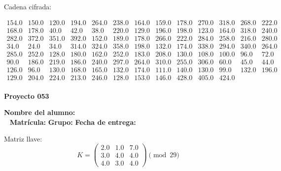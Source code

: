\documentclass[12pt]{article}
\begin{document}
Cadena cifrada:
\begin{center}
$\begin{array}{lllllllllllll}
154.0 & 150.0 & 120.0 & 194.0 & 264.0 & 238.0 & 164.0 & 159.0 & 178.0 & 270.0 & 318.0 & 268.0 & 222.0\\
168.0 & 178.0 & 40.0 & 42.0 & 38.0 & 220.0 & 129.0 & 196.0 & 198.0 & 123.0 & 164.0 & 318.0 & 240.0\\
282.0 & 372.0 & 351.0 & 392.0 & 152.0 & 189.0 & 178.0 & 266.0 & 222.0 & 284.0 & 258.0 & 216.0 & 280.0\\
34.0 & 24.0 & 34.0 & 314.0 & 324.0 & 358.0 & 198.0 & 132.0 & 174.0 & 338.0 & 294.0 & 340.0 & 264.0\\
285.0 & 252.0 & 128.0 & 180.0 & 162.0 & 252.0 & 183.0 & 208.0 & 130.0 & 108.0 & 100.0 & 96.0 & 72.0\\
90.0 & 186.0 & 219.0 & 186.0 & 240.0 & 297.0 & 264.0 & 310.0 & 255.0 & 306.0 & 60.0 & 45.0 & 44.0\\
126.0 & 96.0 & 130.0 & 168.0 & 165.0 & 132.0 & 174.0 & 111.0 & 140.0 & 130.0 & 99.0 & 132.0 & 196.0\\
129.0 & 204.0 & 224.0 & 213.0 & 246.0 & 128.0 & 153.0 & 146.0 & 428.0 & 405.0 & 424.0\\
\end{array}$
\end{center}

\newpage


\textbf{Proyecto 053}

\textbf{Nombre del alumno:} \underline{\hspace{13cm}}\\\
\vspace{1cm}
\textbf{Matrícula:} \underline{\hspace{4cm}} \hspace{1cm}
\textbf{Grupo:} \underline{\hspace{2cm}}
\textbf{Fecha de entrega:} \underline{\hspace{2cm}}

\medskip

Matriz llave:
\[
K = \begin{pmatrix}
2.0 & 1.0 & 7.0\\
3.0 & 4.0 & 4.0\\
4.0 & 3.0 & 4.0
\end{pmatrix} \pmod{29}
\]
\end{document}

